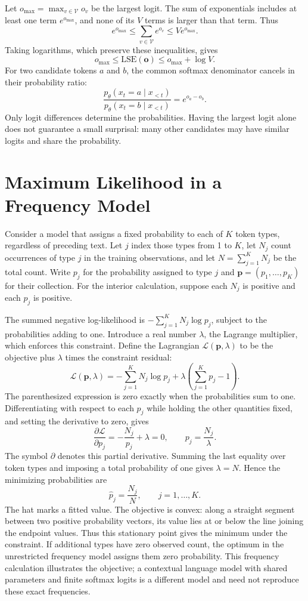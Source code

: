 \documentclass[12pt]{report}
\begin{document}
Let $o_{\max}=\max_{v\in\mathcal V}o_v$ be the largest logit.
The sum of exponentials includes at least one term $e^{o_{\max}}$,
and none of its $V$ terms is larger than that term. Thus
\[
e^{o_{\max}}\leq\sum_{v\in\mathcal V}e^{o_v}
             \leq V e^{o_{\max}}.
\]
Taking logarithms, which preserve these inequalities, gives
\[
o_{\max}\leq\mathrm{LSE}(\mathbf o)
          \leq o_{\max}+\log V.
\]
For two candidate tokens $a$ and $b$, the common softmax
denominator cancels in their probability ratio:
\[
\frac{p_\theta(x_t=a\mid x_{<t})}
     {p_\theta(x_t=b\mid x_{<t})}=e^{o_a-o_b}.
\]
Only logit differences determine the probabilities. Having the
largest logit alone does not guarantee a small surprisal: many
other candidates may have similar logits and share the probability.

\section{Maximum Likelihood in a Frequency Model}
\label{sec:lm-mle-proof}
Consider a model that assigns a fixed probability to each of
$K$ token types, regardless of preceding text. Let $j$ index
those types from 1 to $K$, let $N_j$ count occurrences of type
$j$ in the training observations, and let
$N=\sum_{j=1}^{K}N_j$ be the total count. Write $p_j$ for the
probability assigned to type $j$ and $\mathbf p=(p_1,\ldots,p_K)$
for their collection. For the interior calculation, suppose each
$N_j$ is positive and each $p_j$ is positive.

The summed negative log-likelihood is
$-\sum_{j=1}^{K}N_j\log p_j$, subject to the probabilities adding
to one. Introduce a real number $\lambda$, the Lagrange multiplier,
which enforces this constraint. Define the Lagrangian
$\mathcal L(\mathbf p,\lambda)$ to be the objective plus
$\lambda$ times the constraint residual:
\[
\mathcal L(\mathbf p,\lambda)
 =-\sum_{j=1}^{K}N_j\log p_j
  +\lambda\left(\sum_{j=1}^{K}p_j-1\right).
\]
The parenthesized expression is zero exactly when the probabilities
sum to one. Differentiating with respect to each $p_j$ while holding
the other quantities fixed, and setting the derivative to zero,
gives
\[
\frac{\partial\mathcal L}{\partial p_j}
 =-\frac{N_j}{p_j}+\lambda=0,
\qquad p_j=\frac{N_j}{\lambda}.
\]
The symbol $\partial$ denotes this partial derivative. Summing
the last equality over token types and imposing a total probability
of one gives $\lambda=N$. Hence the minimizing probabilities are
\begin{equation}
\widehat p_j=\frac{N_j}{N},\qquad j=1,\ldots,K.
\label{eq:lm-mle}
\end{equation}
The hat marks a fitted value. The objective is convex: along a
straight segment between two positive probability vectors,
its value lies at or below the line joining the endpoint values.
Thus this stationary point gives the minimum under the
constraint. If additional types have zero
observed count, the optimum in the unrestricted frequency model
assigns them zero probability. This frequency calculation
illustrates the objective; a contextual language model with
shared parameters and finite softmax logits is a different
model and need not reproduce these exact frequencies.
\end{document}
